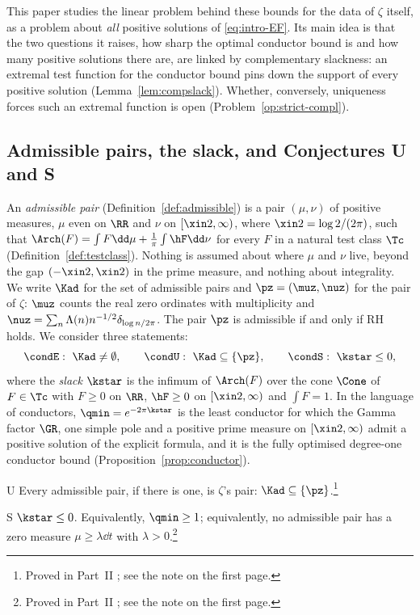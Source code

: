 This paper studies the linear problem behind these bounds for the data of $\zeta$ itself, as a problem about \emph{all}
positive solutions of \eqref{eq:intro-EF}. Its main idea is that the two questions it raises, how sharp the optimal
conductor bound is and how many positive solutions there are, are linked by complementary slackness: an extremal test function for
the conductor bound pins down the support of every positive solution (Lemma~\ref{lem:compslack}). Whether, conversely, uniqueness
forces such an extremal function is open (Problem~\ref{op:strict-compl}).

\subsection{Admissible pairs, the slack, and Conjectures U and S}\label{ssec:intro-pairs}

An \emph{admissible pair} (Definition~\ref{def:admissible}) is a pair $(\mu,\nu)$ of positive measures, $\mu$ even on $\RR$ and
$\nu$ on $[\xin2,\infty)$, where $\xin2=\log2/(2\pi)$, such that $\Arch(F)=\int F\dd\mu+\frac1\pi\int\hF\dd\nu$ for every $F$ in a natural
test class $\Tc$ (Definition~\ref{def:testclass}). Nothing is assumed about where $\mu$ and $\nu$ live, beyond the gap
$(-\xin2,\xin2)$ in the prime measure, and nothing about integrality. We write $\Kad$ for the set of admissible pairs and $\pz=(\muz,\nuz)$
for the pair of $\zeta$: $\muz$ counts the real zero ordinates with multiplicity and $\nuz=\sum_n\Lambda(n)n^{-1/2}\delta_{\log n/2\pi}$. The
pair $\pz$ is admissible if and only if RH holds. We consider three statements:
\[
\condE:\ \Kad\ne\emptyset,\qquad \condU:\ \Kad\subseteq\{\pz\},\qquad \condS:\ \kstar\le0,
\]
where the \emph{slack} $\kstar$ is the infimum of $\Arch(F)$ over the cone $\Cone$ of $F\in\Tc$ with $F\ge0$ on $\RR$, $\hF\ge0$ on
$[\xin2,\infty)$ and $\int F=1$. In the language of conductors, $\qmin=e^{-2\pi\kstar}$ is the least conductor for which the Gamma
factor $\GR$, one simple pole and a positive prime measure on $[\xin2,\infty)$ admit a positive solution of the explicit formula, and
it is the fully optimised degree-one conductor bound (Proposition~\ref{prop:conductor}).

\begin{lconj}{U}\label{conj:U}
Every admissible pair, if there is one, is $\zeta$'s pair: $\Kad\subseteq\{\pz\}$.\footnote{Proved in Part~II \cite{PartII}; see the
note on the first page.}
\end{lconj}

\begin{lconj}{S}\label{conj:S}
$\kstar\le0$. Equivalently, $\qmin\ge1$; equivalently, no admissible pair has a zero measure $\mu\ge\lambda\dd t$ with
$\lambda>0$.\footnote{Proved in Part~II \cite{PartII}; see the note on the first page.}
\end{lconj}

